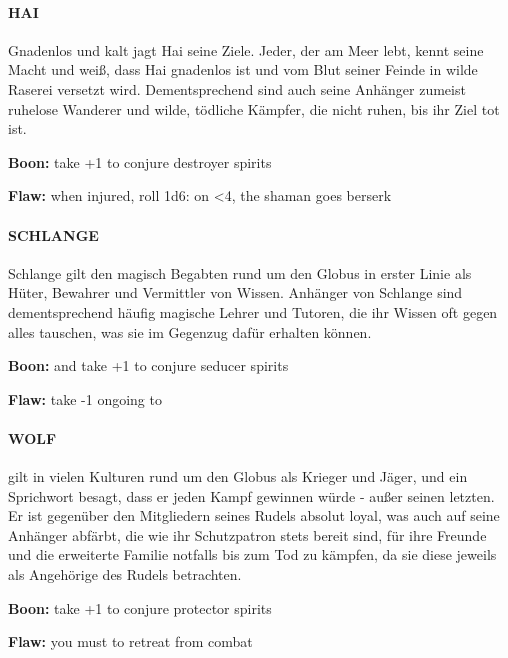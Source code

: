 \paragraph{HAI} Gnadenlos und kalt jagt Hai seine Ziele. Jeder, der am Meer lebt, kennt seine Macht und weiß, dass Hai gnadenlos ist und vom Blut seiner Feinde in wilde Raserei versetzt wird. Dementsprechend sind auch seine Anhänger zumeist ruhelose Wanderer und wilde, tödliche Kämpfer, die nicht ruhen, bis ihr Ziel tot ist.

\textbf{Boon:} take +1 to conjure destroyer spirits

\textbf{Flaw:} when injured, roll 1d6: on <4, the shaman goes berserk


\paragraph{SCHLANGE} Schlange gilt den magisch Begabten rund um den Globus in erster Linie als Hüter, Bewahrer und Vermittler von Wissen. Anhänger von Schlange sind dementsprechend häufig magische Lehrer und Tutoren, die ihr Wissen oft gegen alles tauschen, was sie im Gegenzug dafür erhalten können.

\textbf{Boon:} and take +1 to conjure seducer spirits 

\textbf{Flaw:} take -1 ongoing to 


\paragraph{WOLF} gilt in vielen Kulturen rund um den Globus als Krieger und Jäger, und ein Sprichwort besagt, dass er jeden Kampf gewinnen würde - außer seinen letzten. Er ist gegenüber den Mitgliedern seines Rudels absolut loyal, was auch auf seine Anhänger abfärbt, die wie ihr Schutzpatron stets bereit sind, für ihre Freunde und die erweiterte Familie notfalls bis zum Tod zu kämpfen, da sie diese jeweils als Angehörige des Rudels betrachten.

\textbf{Boon:} take +1 to conjure protector spirits 

\textbf{Flaw:} you must  to retreat from combat

